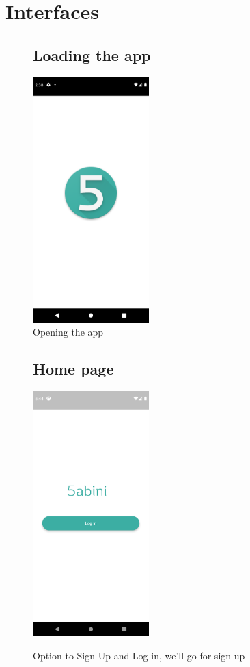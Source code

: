 \documentclass[12pt]{article}
\begin{document}
\section{Interfaces}
\begin{figure}[b!]

\centering
\captionsetup{justification=centering}
\twocolumn
\subsection*{Loading the app}
\includegraphics[width=0.4\textwidth]{./Screenshots/20.PNG}
\caption{Opening the app}
\end{figure}


\begin{figure}[h!]
\subsection*{Home page}
{\includegraphics[width=0.4\textwidth]{./Screenshots/1.PNG}}
  \caption{Option to Sign-Up and Log-in, we'll go for sign up}
\end{figure}
\end{document}

